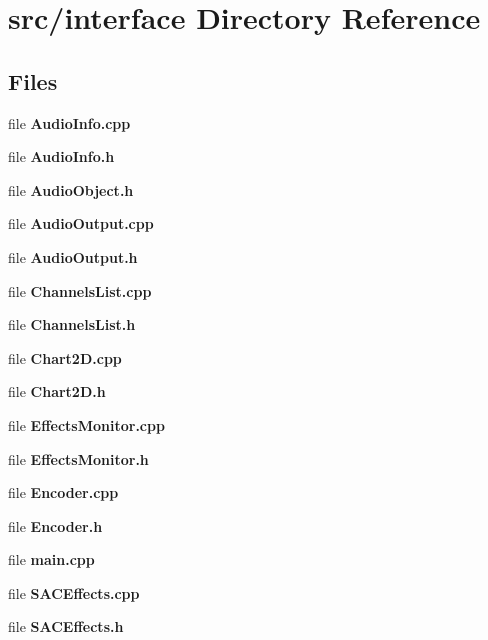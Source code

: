 \section{src/interface Directory Reference}
\label{dir_650ee533936399e683a30afb9473a469}
\subsection*{Files}
\begin{DoxyCompactItemize}
\item 
file \textbf{ Audio\+Info.\+cpp}
\item 
file \textbf{ Audio\+Info.\+h}
\item 
file \textbf{ Audio\+Object.\+h}
\item 
file \textbf{ Audio\+Output.\+cpp}
\item 
file \textbf{ Audio\+Output.\+h}
\item 
file \textbf{ Channels\+List.\+cpp}
\item 
file \textbf{ Channels\+List.\+h}
\item 
file \textbf{ Chart2\+D.\+cpp}
\item 
file \textbf{ Chart2\+D.\+h}
\item 
file \textbf{ Effects\+Monitor.\+cpp}
\item 
file \textbf{ Effects\+Monitor.\+h}
\item 
file \textbf{ Encoder.\+cpp}
\item 
file \textbf{ Encoder.\+h}
\item 
file \textbf{ main.\+cpp}
\item 
file \textbf{ S\+A\+C\+Effects.\+cpp}
\item 
file \textbf{ S\+A\+C\+Effects.\+h}
\end{DoxyCompactItemize}

